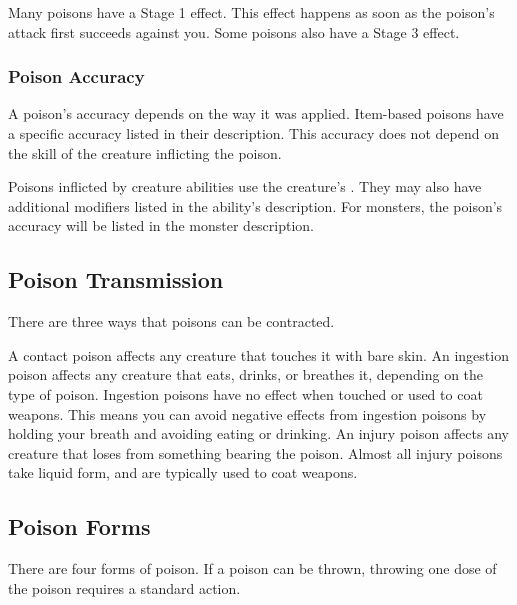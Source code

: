       Many poisons have a Stage 1 effect.
      This effect happens as soon as the poison's attack first succeeds against you.
      Some poisons also have a Stage 3 effect.

    \subsubsection{Poison Accuracy}
      A poison's accuracy depends on the way it was applied.
      Item-based poisons have a specific accuracy listed in their description.
      This accuracy does not depend on the skill of the creature inflicting the poison.

      Poisons inflicted by creature abilities use the creature's .
      They may also have additional modifiers listed in the ability's description.
      For monsters, the poison's accuracy will be listed in the monster description.

  \subsection{Poison Transmission}\label{Poison Transmission}\label{Transmission}

    There are three ways that poisons can be contracted.

     A contact poison affects any creature that touches it with bare skin.
     An ingestion poison affects any creature that eats, drinks, or breathes it, depending on the type of poison.
    Ingestion poisons have no effect when touched or used to coat weapons.
    This means you can avoid negative effects from ingestion poisons by holding your breath and avoiding eating or drinking.
     An injury poison affects any creature that loses  from something bearing the poison.
    Almost all injury poisons take liquid form, and are typically used to coat weapons.

  \subsection{Poison Forms}\label{Poison Forms}

    There are four forms of poison.
    If a poison can be thrown, throwing one dose of the poison requires a standard action.

